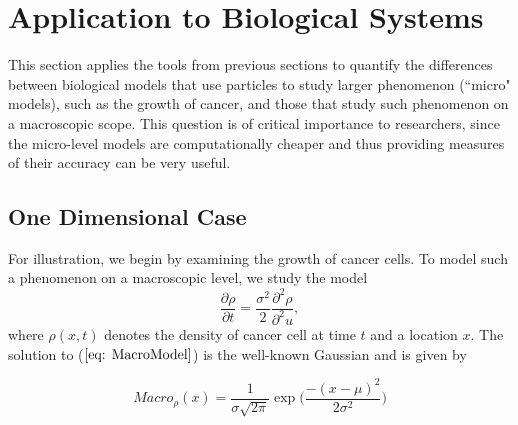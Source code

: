 \documentclass[10pt]{article}
\begin{document}
 
 


\section{Application to Biological Systems}
\label{sec: BioSystems}
This section applies the tools from previous sections to quantify the differences between biological models that use particles to study larger phenomenon (``micro" models), such as the growth of cancer, and those that study such phenomenon on a macroscopic scope. This question is of critical importance to researchers, since the micro-level models are computationally cheaper and thus providing measures of their accuracy can be very useful. 

\subsection{One Dimensional Case}
For illustration, we begin by examining the growth of cancer cells. To model such a phenomenon on a macroscopic level, we study the model
\begin{equation}
\frac{\partial \rho}{\partial t}  = \frac{\sigma^2}{2}\frac{\partial^2 \rho}{\partial^2 u},
\label{eq: MacroModel}
\end{equation}
where $\rho(x,t)$ denotes the density of cancer cell at time $t$ and a location $x$. The solution to ($\ref{eq: MacroModel}$) is the well-known Gaussian and is given by

\begin{equation*}
Macro_\rho(x) = \frac{1}{\sigma \sqrt{2\pi}}\exp\Big(\frac{-(x-\mu)^2}{2\sigma^2}\Big)
\end{equation*}
\end{document}
